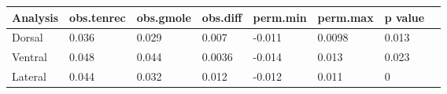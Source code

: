 \begin{tabular}[t]{l l l l l l l l }		
\hline
Analysis & obs.tenrec & obs.gmole & obs.diff & perm.min & perm.max & p value \\
\hline
Dorsal & 0.036 & 0.029 & 0.007 & -0.011 & 0.0098 &  0.013 \\
Ventral &  0.048 & 0.044 & 0.0036 & -0.014 & 0.013 &  0.023\\
Lateral & 0.044 & 0.032 & 0.012 & -0.012 & 0.011 & 0 \\
\hline
\end{tabular}